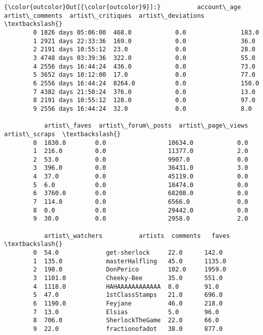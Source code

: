 \documentclass[11pt]{article}
\begin{document}
\begin{Verbatim}[commandchars=\\\{\}]
{\color{outcolor}Out[{\color{outcolor}9}]:}          account\_age  artist\_comments  artist\_critiques  artist\_deviations  \textbackslash{}
        0 1826 days 05:06:00  468.0            0.0               183.0               
        1 2921 days 22:33:36  169.0            0.0               36.0                
        2 2191 days 10:55:12  23.0             0.0               28.0                
        3 4748 days 03:39:36  322.0            0.0               55.0                
        4 2556 days 16:44:24  436.0            0.0               73.0                
        5 3652 days 10:12:00  17.0             0.0               77.0                
        6 2556 days 16:44:24  8264.0           0.0               150.0               
        7 4382 days 21:50:24  376.0            0.0               13.0                
        8 2191 days 10:55:12  128.0            0.0               97.0                
        9 2556 days 16:44:24  32.0             0.0               8.0                 
        
           artist\_faves  artist\_forum\_posts  artist\_page\_views  artist\_scraps  \textbackslash{}
        0  1830.0        0.0                 10634.0            0.0             
        1  216.0         0.0                 11377.0            2.0             
        2  53.0          0.0                 9907.0             0.0             
        3  396.0         0.0                 36431.0            3.0             
        4  37.0          0.0                 45119.0            0.0             
        5  6.0           0.0                 18474.0            0.0             
        6  3760.0        0.0                 68208.0            0.0             
        7  114.0         0.0                 6566.0             0.0             
        8  0.0           0.0                 29442.0            0.0             
        9  30.0          0.0                 2958.0             2.0             
        
           artist\_watchers          artists  comments   faves  \textbackslash{}
        0  54.0             get-sherlock     22.0      142.0    
        1  135.0            masterHalfling   45.0      1135.0   
        2  198.0            DonPerico        102.0     1959.0   
        3  1101.0           Cheeky-Bee       35.0      551.0    
        4  1118.0           HAHAAAAAAAAAAAA  8.0       91.0     
        5  47.0             1stClassStamps   21.0      696.0    
        6  1190.0           Feyjane          46.0      218.0    
        7  13.0             Elsias           5.0       96.0     
        8  706.0            SherlockTheGame  22.0      66.0     
        9  22.0             fractionofadot   38.0      877.0    
        

\end{Verbatim}
\end{document}
